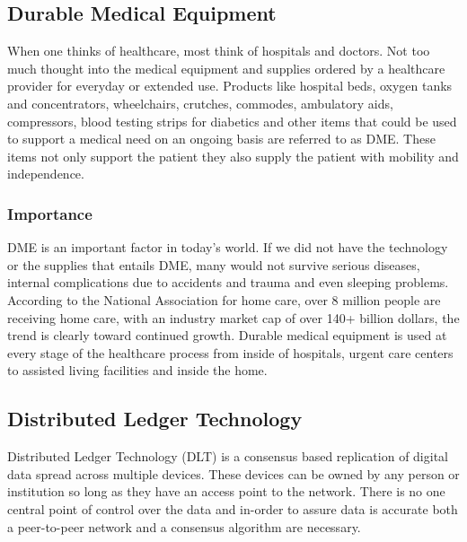\documentclass[12pt]{article}
\begin{document}
  \subsection{Durable Medical Equipment}
  When one thinks of healthcare, most think of hospitals and doctors. Not too much thought into the medical equipment and supplies ordered by a healthcare provider for everyday or extended use. Products like hospital beds, oxygen tanks and concentrators, wheelchairs, crutches, commodes, ambulatory aids, compressors, blood testing strips for diabetics and other items that could be used to support a medical need on an ongoing basis are referred to as DME. These items not only support the patient they also supply the patient with mobility and independence.

    \subsubsection{Importance}
    DME is an important factor in today’s world. If we did not have the technology or the supplies that entails DME, many would not survive serious diseases, internal complications due to accidents and trauma and even sleeping problems. According to the National Association for home care, over 8 million people are receiving home care, with an industry market cap of over 140+ billion dollars, the trend is clearly toward continued growth. Durable medical equipment is used at every stage of the healthcare process from inside of hospitals, urgent care centers to assisted living facilities and inside the home.

  \subsection{Distributed Ledger Technology}
  Distributed Ledger Technology (DLT) is a consensus based replication of digital data spread across multiple devices. These devices can be owned by any person or institution so long as they have an access point to the network. There is no one central point of control over the data and in-order to assure data is accurate both a peer-to-peer network and a consensus algorithm are necessary.
\end{document}

